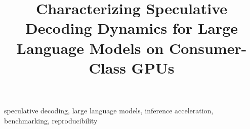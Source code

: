 \documentclass[conference]{IEEEtran}
\newif\ifcameraready
\newcommand\AtPageUpperMyright[1]{\AtPageUpperLeft{%
 \put(\LenToUnit{0.17\paperwidth},\LenToUnit{-2cm}){%
     \parbox{0.9\textwidth}{\raggedleft\fontsize{8}{11}\selectfont #1}}%
 }}%
\newcommand{\conf}[1]{%
\AddToShipoutPictureBG*{%
\AtPageUpperMyright{#1}
}
}
\begin{document}
\title{\vspace*{1cm}Characterizing Speculative Decoding Dynamics for Large Language Models on Consumer-Class GPUs}

\ifcameraready
  \author{
  \IEEEauthorblockN{Samsu Sempena}
  \IEEEauthorblockA{The University of Sydney\\
  ssem0956@uni.sydney.edu.au}
  \and
  \IEEEauthorblockN{Zhuohan Cui}
  \IEEEauthorblockA{The University of Sydney\\
  zcui0321@uni.sydney.edu.au}
  }
\else
  \author{
  }
\fi

\maketitle
\ifcameraready
  \conf{\textit{Proc. of the International Conference on Electrical, Computer, Communications and Mechatronics Engineering (ICECCME 2026) \\
  15-17 October 2026, Bali, Indonesia}}
\fi



\begin{IEEEkeywords}
speculative decoding, large language models, inference acceleration, benchmarking, reproducibility
\end{IEEEkeywords}








\ifcameraready
  
\fi

{\small


}
\end{document}
